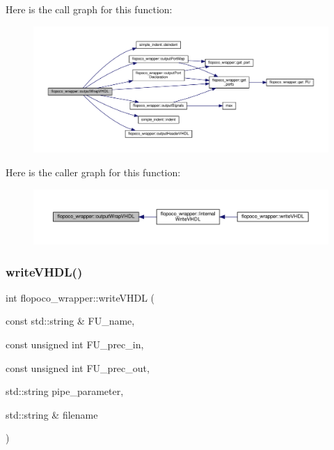 Here is the call graph for this function\+:
\nopagebreak
\begin{figure}[H]
\begin{center}
\leavevmode
\includegraphics[width=350pt]{d7/dbf/classflopoco__wrapper_ad0575cadd6eee1f9c3bcdac90eb05b0e_cgraph}
\end{center}
\end{figure}
Here is the caller graph for this function\+:
\nopagebreak
\begin{figure}[H]
\begin{center}
\leavevmode
\includegraphics[width=350pt]{d7/dbf/classflopoco__wrapper_ad0575cadd6eee1f9c3bcdac90eb05b0e_icgraph}
\end{center}
\end{figure}
\mbox{\label{classflopoco__wrapper_ac9b07db0e6bdc7bb6a7477fe26aba92f}} 
\subsubsection{\texorpdfstring{write\+V\+H\+D\+L()}{writeVHDL()}}
{\footnotesize\ttfamily int flopoco\+\_\+wrapper\+::write\+V\+H\+DL (\begin{DoxyParamCaption}\item[{const std\+::string \&}]{F\+U\+\_\+name,  }\item[{const unsigned int}]{F\+U\+\_\+prec\+\_\+in,  }\item[{const unsigned int}]{F\+U\+\_\+prec\+\_\+out,  }\item[{std\+::string}]{pipe\+\_\+parameter,  }\item[{std\+::string \&}]{filename }\end{DoxyParamCaption})}



